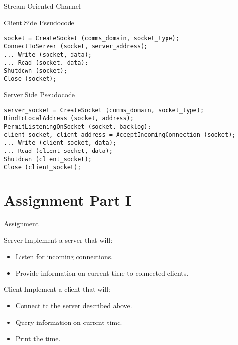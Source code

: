 \begin{frame}[fragile]{Stream Oriented Channel}
    \begin{block}{Client Side Pseudocode}
\begin{lstlisting}[style=mini]
socket = CreateSocket (comms_domain, socket_type);
ConnectToServer (socket, server_address);
... Write (socket, data);
... Read (socket, data);
Shutdown (socket);
Close (socket);
\end{lstlisting}
    \end{block}
    \begin{block}{Server Side Pseudocode}
\begin{lstlisting}[style=mini]
server_socket = CreateSocket (comms_domain, socket_type);
BindToLocalAddress (socket, address);
PermitListeningOnSocket (socket, backlog);
client_socket, client_address = AcceptIncomingConnection (socket);
... Write (client_socket, data);
... Read (client_socket, data);
Shutdown (client_socket);
Close (client_socket);
\end{lstlisting}
    \end{block}
\end{frame}


\section{Assignment Part I}


\begin{frame}{Assignment}
    \begin{block}{Server}
        Implement a server that will:
        \begin{itemize}
            \item Listen for incoming connections.
            \item Provide information on current time to connected clients.
        \end{itemize}
    \end{block}

    \bigskip

    \begin{block}{Client}
        Implement a client that will:
        \begin{itemize}
            \item Connect to the server described above.
            \item Query information on current time.
            \item Print the time.
        \end{itemize}
    \end{block}
\end{frame}


